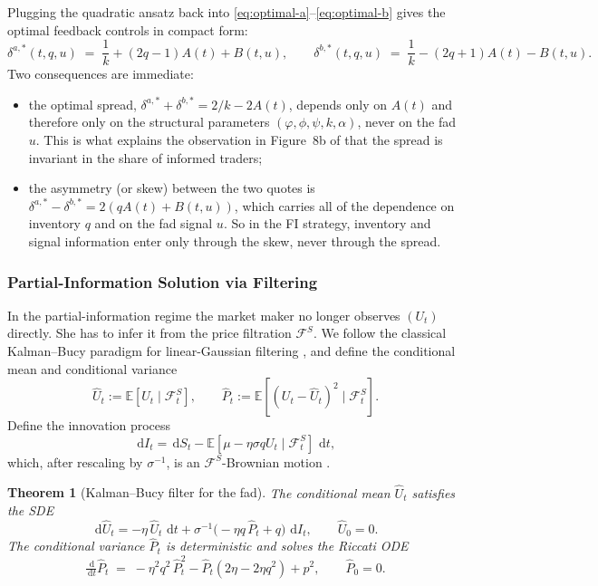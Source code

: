 \documentclass[11pt,a4paper]{article}
\theoremstyle{plain}
\newtheorem{theorem}{Theorem}[section]
\theoremstyle{definition}
\newcommand{\E}{\mathbb{E}}
\newcommand{\F}{\mathcal{F}}
\newcommand{\dd}{\,\mathrm{d}}
\begin{document}
Plugging the quadratic ansatz back into \eqref{eq:optimal-a}--\eqref{eq:optimal-b}
gives the optimal feedback controls in compact form:
\begin{equation}
\label{eq:optimal-quadratic}
  \delta^{a,*}(t,q,u) \;=\; \frac{1}{k} + (2q-1)A(t) + B(t,u),
  \qquad
  \delta^{b,*}(t,q,u) \;=\; \frac{1}{k} - (2q+1)A(t) - B(t,u).
\end{equation}
Two consequences are immediate:
\begin{itemize}[noitemsep]
  \item the optimal spread,
        $\delta^{a,*}+\delta^{b,*} = 2/k - 2A(t)$, depends only on
        $A(t)$ and therefore only on the structural parameters
        $(\varphi,\phi,\psi,k,\alpha)$, never on the fad $u$. This is
        what explains the observation in Figure~8b of
        \cite{barucci2025market} that the spread is invariant in the
        share of informed traders;
  \item the asymmetry (or skew) between the two quotes is
        $\delta^{a,*}-\delta^{b,*} = 2(qA(t)+B(t,u))$, which carries all
        of the dependence on inventory $q$ and on the fad signal $u$. So
        in the FI strategy, inventory and signal information enter only
        through the skew, never through the spread.
\end{itemize}

\subsubsection{Partial-Information Solution via Filtering}

In the partial-information regime the market maker no longer observes
$(U_t)$ directly. She has to infer it from the price filtration
$\F^S$. We follow the classical Kalman--Bucy paradigm for linear-Gaussian
filtering \cite{bain2009fundamentals}, and define the conditional mean and
conditional variance
\begin{equation}
\label{eq:hatU}
  \hat{U}_t := \E[U_t\mid\F^S_t], \qquad
  \hat{P}_t := \E[(U_t-\hat{U}_t)^2 \mid \F^S_t].
\end{equation}
Define the innovation process
\[
  \dd I_t = \dd S_t - \E[\mu - \eta\sigma q U_t \mid \F^S_t]\,\dd t,
\]
which, after rescaling by $\sigma^{-1}$, is an $\F^S$-Brownian motion
\cite{bain2009fundamentals}.

\begin{theorem}[Kalman--Bucy filter for the fad]
\label{thm:kalman}
The conditional mean $\hat{U}_t$ satisfies the SDE
\begin{equation}
\label{eq:hatU-dyn}
  \dd \hat{U}_t = -\eta\,\hat{U}_t\,\dd t
    + \sigma^{-1}\bigl(-\eta q\,\hat{P}_t + q\bigr)\,\dd I_t,
  \qquad \hat{U}_0 = 0.
\end{equation}
The conditional variance $\hat{P}_t$ is deterministic and solves the
Riccati ODE
\begin{equation}
\label{eq:hatP-dyn}
  \tfrac{\dd}{\dd t}\hat{P}_t
  \;=\; -\eta^2 q^2\,\hat{P}_t^2
       - \hat{P}_t(2\eta - 2\eta q^2) + p^2,
  \qquad \hat{P}_0 = 0.
\end{equation}
\end{theorem}
\end{document}
